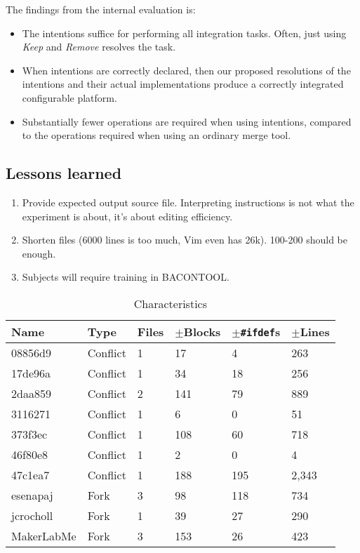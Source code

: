 The findings from the internal evaluation is:

\begin{itemize}
    \item The intentions suffice for performing all integration tasks. Often, just using \textit{Keep} and \textit{Remove} resolves the task.
    \item When intentions are correctly declared, then our proposed resolutions of the intentions and their actual implementations produce a correctly integrated configurable platform.
    \item Substantially fewer operations are required when using intentions, compared to the operations required when using an ordinary merge tool.
\end{itemize}

\subsection{Lessons learned}
\begin{enumerate}
    \item Provide expected output source file. Interpreting instructions is not what the experiment is about, it's about editing efficiency.
    \item Shorten files (6000 lines is too much, Vim even has 26k). 100-200 should be enough.
    \item Subjects will require training in BACONTOOL.
\end{enumerate}

\begin{table}[h]
    \centering
    \caption{Characteristics}
    \label{tab:internalchar}
    \begin{tabular}{lll|lll}
\hline\hline
\textbf{Name} & \textbf{Type} & \textbf{Files} & \textbf{$\pm$Blocks} & \textbf{$\pm$\texttt{\#ifdef}s} & \textbf{$\pm$Lines} \\
\hline
08856d9      & Conflict     & 1 & 17    & 4     & 263   \\
17de96a      & Conflict     & 1 & 34    & 18    & 256   \\
2daa859      & Conflict     & 2 & 141 & 79      & 889   \\
3116271      & Conflict     & 1 & 6     & 0     & 51    \\
373f3ec      & Conflict     & 1 & 108 & 60      & 718   \\
46f80e8      & Conflict     & 1 & 2     & 0     & 4     \\
47c1ea7      & Conflict     & 1 & 188   & 195   & 2,343 \\
\hline
esenapaj     & Fork         & 3 & 98    & 118   & 734   \\
jcrocholl    & Fork         & 1 & 39    & 27    & 290   \\
MakerLabMe   & Fork         & 3 & 153   & 26    & 423   \\
\hline\hline
    \end{tabular}
\end{table}

